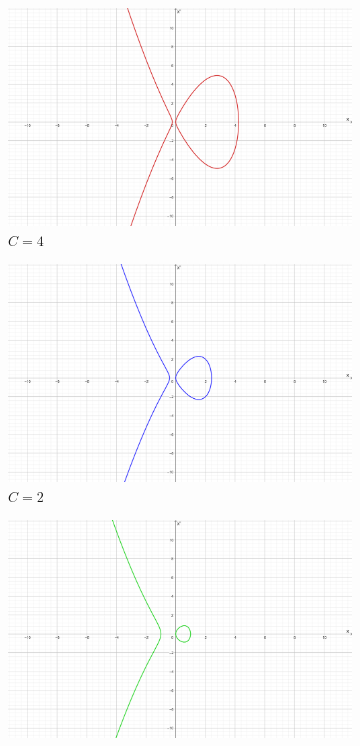\documentclass{article}
\begin{document}
 
 \begin{figure}
\centering
\begin{subfigure}{0.45\textwidth}
  \includegraphics[width=\textwidth]{C=4.png}
  \caption{$C = 4$ }
\end{subfigure}\hfill%
\begin{subfigure}{0.45\textwidth}
  \includegraphics[width=\textwidth]{C=2.png}
  \caption{$C = 2$}
  \end{subfigure}\hfill
  \begin{subfigure}{0.45\textwidth}
  \includegraphics[width=\textwidth]{C=0.png}

\end{subfigure}
\end{figure}
\end{document}
